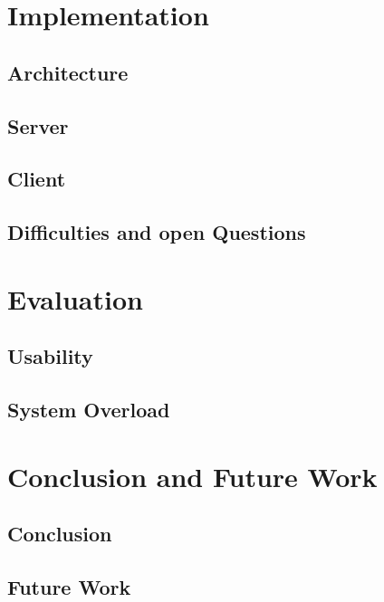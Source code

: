 \documentclass[english, BCOR=6mm, twoside=true, open=right]{tudscrreprt}
\begin{document}
\chapter{Implementation}
\section{Architecture}
\section{Server}
\section{Client}
\section{Difficulties and open Questions}


\chapter{Evaluation}
\section{Usability}
\section{System Overload}


\chapter{Conclusion and Future Work}
\section{Conclusion}
\section{Future Work}


\newpage
{}
\listoffigures

\newpage
{}
\listoftables

\newpage
{}
\printglossary

\newpage
{}


\end{document}
